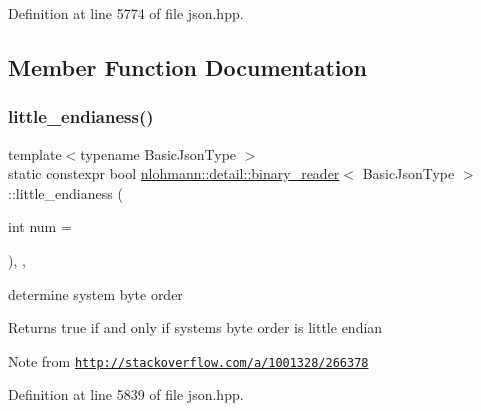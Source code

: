 Definition at line 5774 of file json.\+hpp.



\subsection{Member Function Documentation}
\mbox{\label{classnlohmann_1_1detail_1_1binary__reader_a1d8f70f95d241354f86a0b9ae711c1c3}} 
\subsubsection{\texorpdfstring{little\+\_\+endianess()}{little\_endianess()}}
{\footnotesize\ttfamily template$<$typename Basic\+Json\+Type $>$ \\
static constexpr bool \hyperlink{classnlohmann_1_1detail_1_1binary__reader}{nlohmann\+::detail\+::binary\+\_\+reader}$<$ Basic\+Json\+Type $>$\+::little\+\_\+endianess (\begin{DoxyParamCaption}\item[{int}]{num = {} }\end{DoxyParamCaption})\hspace{0.3cm}{\ttfamily [inline]}, {\ttfamily [static]}, {\ttfamily [noexcept]}}



determine system byte order 

\begin{DoxyReturn}{Returns}
true if and only if system\textquotesingle{}s byte order is little endian
\end{DoxyReturn}
\begin{DoxyNote}{Note}
from \href{http://stackoverflow.com/a/1001328/266378}{\tt http\+://stackoverflow.\+com/a/1001328/266378} 
\end{DoxyNote}


Definition at line 5839 of file json.\+hpp.

\mbox{\label{classnlohmann_1_1detail_1_1binary__reader_a68ef932b48547bc4e6ce1df2856f6b8f}} 
